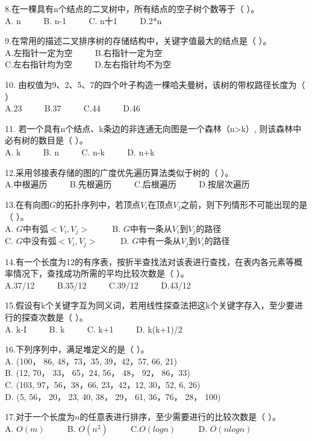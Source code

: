 8.在一棵具有n个结点的二叉树中，所有结点的空子树个数等于（    ）。 \\
A. n $\qquad$ B. n-1 $\qquad$ C. n十1 $\qquad$ D.2*n

9.在常用的描述二叉排序树的存储结构中，关键字值最大的结点是（    ）。 \\
A.左指针一定为空 $\qquad$ B.右指针一定为空 \\
C.左右指针均为空 $\qquad$ D.左右指针均不为空

10. 由权值为9、2、5、7的四个叶子构造一棵哈夫曼树，该树的带权路径长度为（    ） \\
A.23 $\qquad$ B.37 $\qquad$ C.44 $\qquad$ D.46

11. 若一个具有n个结点、k条边的非连通无向图是一个森林（n>k）, 则该森林中必有树的数目是（    ）。 \\
A. k $\qquad$ B. n $\qquad$ C. n-k $\qquad$ D. n+k

12.采用邻接表存储的图的广度优先遍历算法类似于树的（    ）。 \\
A.中根遍历 $\qquad$ B.先根遍历 $\qquad$ C.后根遍历 $\qquad$ D.按层次遍历

13.在有向图$G$的拓扑序列中，若顶点$V_i$在顶点$V_j$之前，则下列情形不可能出现的是（    ）。 \\
A. $G$中有弧$<V_i,V_j>$ $\qquad$ B. $G$中有一条从$V_i$到$V_j$的路径 \\
C. $G$中没有弧$<V_i,V_j>$ $\qquad$ D. $G$中有一条从$V_j$到$V_i$的路径

14.有一个长度为12的有序表，按折半查找法对该表进行查找，在表内各元素等概率情况下，查找成功所需的平均比较次数是（    ）。 \\
A.37/12 $\qquad$ B.35/12 $\qquad$ C.39/12 $\qquad$ D.43/12

15.假设有k个关键字互为同义词，若用线性探查法把这k个关键字存入，至少要进行的探查次数是（    ）。 \\
A. k-I $\qquad$ B. k $\qquad$ C. k+1 $\qquad$ D. k(k+1)/2

16.下列序列中，满足堆定义的是（    ）。 \\
A. (100， 86, 48，73，35, 39，42，57, 66, 21) \\
B. (12, 70， 33， 65，24, 56， 48， 92， 86，33) \\
C. (103, 97，56，38，66, 23，42，12, 30，52, 6, 26) \\
D. (5, 56， 20， 23, 40, 38， 29， 61, 36，76， 28， 100)

17.对于一个长度为$n$的任意表进行排序，至少需要进行的比较次数是（ ）。 \\
A. $O(m)$ $\qquad$ B. $O(n^2)$ $\qquad$ C.$O(logn)$ $\qquad$ D. $O(nlogn)$

